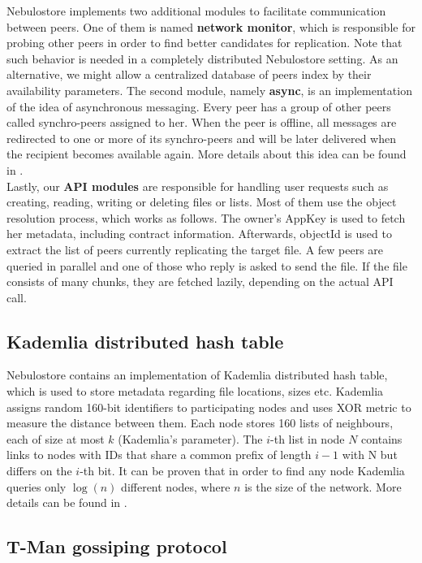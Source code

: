\documentclass{pracamgren}
\begin{document}
Nebulostore implements two additional modules to facilitate communication between peers. One of them is named {\bf network monitor}, which is responsible for probing other peers in order to find better candidates for replication. Note that such behavior is needed in a completely distributed Nebulostore setting. As an alternative, we might allow a centralized database of peers index by their availability parameters. The second module, namely {\bf async}, is an implementation of the idea of asynchronous messaging. Every peer has a group of other peers called synchro-peers assigned to her. When the peer is offline, all messages are redirected to one or more of its synchro-peers and will be later delivered when the recipient becomes available again. More details about this idea can be found in \cite{hetero}.\\

Lastly, our {\bf API modules} are responsible for handling user requests such as creating, reading, writing or deleting files or lists. Most of them use the object resolution process, which works as follows. The owner's AppKey is used to fetch her metadata, including contract information. Afterwards, objectId is used to extract the list of peers currently replicating the target file. A few peers are queried in parallel and one of those who reply is asked to send the file. If the file consists of many chunks, they are fetched lazily, depending on the actual API call.\\

\subsection{Kademlia distributed hash table}\label{sect:kademlia}

Nebulostore contains an implementation of Kademlia distributed hash table, which is used to store metadata regarding file locations, sizes etc. Kademlia assigns random 160-bit identifiers to participating nodes and uses XOR metric to measure the distance between them. Each node stores 160 lists of neighbours, each of size at most $k$ (Kademlia's parameter). The $i$-th list in node $N$ contains links to nodes with IDs that share a common prefix of length $i-1$ with N but differs on the $i$-th bit. It can be proven that in order to find any node Kademlia queries only $\log(n)$ different nodes, where $n$ is the size of the network. More details can be found in \cite{kademlia}.\\

\subsection{T-Man gossiping protocol}
\end{document}
